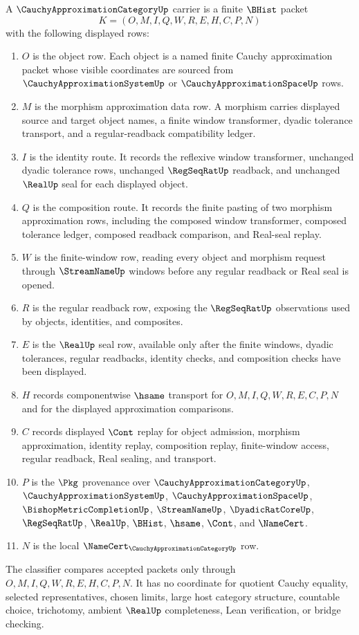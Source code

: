 \begin{definition}
\label{def:cauchy-approximation-category-carrier}
A $\CauchyApproximationCategoryUp$ carrier is a finite $\BHist$ packet
$$
K=(O,M,I,Q,W,R,E,H,C,P,N)
$$
with the following displayed rows:
\begin{enumerate}
\item $O$ is the object row. Each object is a named finite Cauchy approximation packet whose visible coordinates are sourced from $\CauchyApproximationSystemUp$ or $\CauchyApproximationSpaceUp$ rows.
\item $M$ is the morphism approximation data row. A morphism carries displayed source and target object names, a finite window transformer, dyadic tolerance transport, and a regular-readback compatibility ledger.
\item $I$ is the identity route. It records the reflexive window transformer, unchanged dyadic tolerance rows, unchanged $\RegSeqRatUp$ readback, and unchanged $\RealUp$ seal for each displayed object.
\item $Q$ is the composition route. It records the finite pasting of two morphism approximation rows, including the composed window transformer, composed tolerance ledger, composed readback comparison, and Real-seal replay.
\item $W$ is the finite-window row, reading every object and morphism request through $\StreamNameUp$ windows before any regular readback or Real seal is opened.
\item $R$ is the regular readback row, exposing the $\RegSeqRatUp$ observations used by objects, identities, and composites.
\item $E$ is the $\RealUp$ seal row, available only after the finite windows, dyadic tolerances, regular readbacks, identity checks, and composition checks have been displayed.
\item $H$ records componentwise $\hsame$ transport for $O,M,I,Q,W,R,E,C,P,N$ and for the displayed approximation comparisons.
\item $C$ records displayed $\Cont$ replay for object admission, morphism approximation, identity replay, composition replay, finite-window access, regular readback, Real sealing, and transport.
\item $P$ is the $\Pkg$ provenance over $\CauchyApproximationCategoryUp$, $\CauchyApproximationSystemUp$, $\CauchyApproximationSpaceUp$, $\BishopMetricCompletionUp$, $\StreamNameUp$, $\DyadicRatCoreUp$, $\RegSeqRatUp$, $\RealUp$, $\BHist$, $\hsame$, $\Cont$, and $\NameCert$.
\item $N$ is the local $\NameCert_{\CauchyApproximationCategoryUp}$ row.
\end{enumerate}
The classifier compares accepted packets only through $O,M,I,Q,W,R,E,H,C,P,N$. It has no coordinate for quotient Cauchy equality, selected representatives, chosen limits, large host category structure, countable choice, trichotomy, ambient $\RealUp$ completeness, Lean verification, or bridge checking.
\end{definition}

